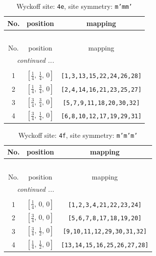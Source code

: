 \documentclass[fleqn,8pt]{jsarticle}
\begin{document}
\renewcommand{\arraystretch}{1.2}
\begin{longtable}{ccc}
\caption{Wyckoff site: {\tt 4e}, site symmetry: {\tt m'mm'}}
 \\
 \hline \hline
No. & position & mapping \\ \hline \endfirsthead

\multicolumn{2}{l}{\tablename\ \thetable{}} \\
 \hline \hline
No. & position & mapping \\ \hline \endhead

 \hline \hline
\multicolumn{2}{r}{\footnotesize\it continued ...} \\ \endfoot

 \hline \hline
\multicolumn{2}{r}{} \\ \endlastfoot

1 & $\left[ \frac{1}{4},\, \frac{1}{4},\, 0 \right]$ & {\tt [1,3,13,15,22,24,26,28]} \\ \hline
2 & $\left[ \frac{1}{4},\, \frac{3}{4},\, 0 \right]$ & {\tt [2,4,14,16,21,23,25,27]} \\ \hline
3 & $\left[ \frac{3}{4},\, \frac{3}{4},\, 0 \right]$ & {\tt [5,7,9,11,18,20,30,32]} \\ \hline
4 & $\left[ \frac{3}{4},\, \frac{1}{4},\, 0 \right]$ & {\tt [6,8,10,12,17,19,29,31]} \\
\end{longtable}
\renewcommand{\arraystretch}{1.2}
\begin{longtable}{ccc}
\caption{Wyckoff site: {\tt 4f}, site symmetry: {\tt m'm'm'}}
 \\
 \hline \hline
No. & position & mapping \\ \hline \endfirsthead

\multicolumn{2}{l}{\tablename\ \thetable{}} \\
 \hline \hline
No. & position & mapping \\ \hline \endhead

 \hline \hline
\multicolumn{2}{r}{\footnotesize\it continued ...} \\ \endfoot

 \hline \hline
\multicolumn{2}{r}{} \\ \endlastfoot

1 & $\left[ \frac{1}{4},\, 0,\, 0 \right]$ & {\tt [1,2,3,4,21,22,23,24]} \\ \hline
2 & $\left[ \frac{3}{4},\, 0,\, 0 \right]$ & {\tt [5,6,7,8,17,18,19,20]} \\ \hline
3 & $\left[ \frac{3}{4},\, \frac{1}{2},\, 0 \right]$ & {\tt [9,10,11,12,29,30,31,32]} \\ \hline
4 & $\left[ \frac{1}{4},\, \frac{1}{2},\, 0 \right]$ & {\tt [13,14,15,16,25,26,27,28]} \\
\end{longtable}
\end{document}
